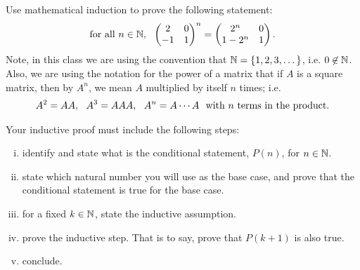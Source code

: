 \begin{question}
	\normalfont
	
	Use mathematical induction to prove the following statement:
	\begin{align*}
		\textnormal{for all}\ n\in\Natural,\ \ 
		\MatTwoTwo{2}{0}{-1}{1}^n
		= \MatTwoTwo{2^n}{0}{1-2^n}{1}.
	\end{align*}
	Note, in this class we are using the convention that $\mathbb{N} = \{1,2,3,\dots\}$, i.e. $0\not\in\mathbb{N}$.
	Also, we are using the notation for the power of a matrix that if $A$ is a square matrix, then by $A^n$, we mean $A$ multiplied by itself $n$ times; i.e.
	\begin{align*}
		A^2 = AA,\ \ A^3 = AAA,\ \ A^n = A\cdots A\ \ \textnormal{with $n$ terms in the product}.
	\end{align*}
	
	Your inductive proof must include the following steps:
	\begin{enumerate}[(i)]
		\item identify and state what is the conditional statement, $P(n)$, for $n\in \mathbb{N}$.
		\item state which natural number you will use as the base case, and prove that the conditional statement is true for the base case.
		\item for a fixed $k\in\mathbb{N}$, state the inductive assumption.
		\item prove the inductive step.  That is to say, prove that $P(k+1)$ is also true.
		\item conclude.
	\end{enumerate}
\end{question}
